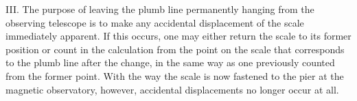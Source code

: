 III. The purpose of leaving the plumb line permanently hanging from the observing telescope is to make any accidental displacement of the scale immediately apparent. If this occurs, one may either return the scale to its former position or count in the calculation from the point on the scale that corresponds to the plumb line after the change, in the same way as one previously counted from the former point. With the way the scale is now fastened to the pier at the magnetic observatory, however, accidental displacements no longer occur at all.

